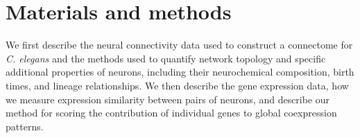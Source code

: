 \documentclass[10pt,letterpaper]{article}
\begin{document}


\section*{Materials and methods}

We first describe the neural connectivity data used to construct a connectome for \textit{C. elegans} and the methods used to quantify network topology and specific additional properties of neurons, including their neurochemical composition, birth times, and lineage relationships.
We then describe the gene expression data, how we measure expression similarity between pairs of neurons, and describe our method for scoring the contribution of individual genes to global coexpression patterns.
\end{document}
